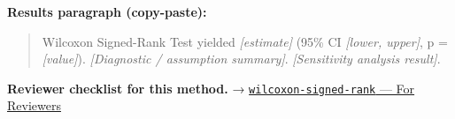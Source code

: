 \documentclass[
]{article}
\begin{document}
\textbf{Results paragraph (copy-paste):}

\begin{quote}
Wilcoxon Signed-Rank Test yielded \emph{{[}estimate{]}} (95\% CI
\emph{{[}lower, upper{]}}, p = \emph{{[}value{]}}). \emph{{[}Diagnostic
/ assumption summary{]}}. \emph{{[}Sensitivity analysis result{]}}.
\end{quote}

\textbf{Reviewer checklist for this method.} →
\href{../chapters/04-inferential/wilcoxon-signed-rank.Rmd\#for-reviewers}{\texttt{wilcoxon-signed-rank}
--- For Reviewers}
\end{document}
